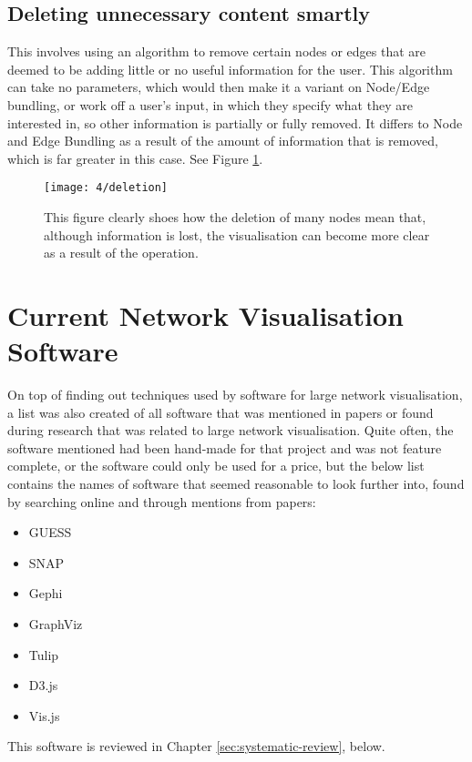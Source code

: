 \documentclass[../dissertation.tex]{subfiles}
\begin{document}
\subsection{Deleting unnecessary content smartly}
This involves using an algorithm to remove certain nodes or edges that are deemed to be adding little or no useful information for the user. This algorithm can take no parameters, which would then make it a variant on Node/Edge bundling, or work off a user's input, in which they specify what they are interested in, so other information is partially or fully removed. It differs to Node and Edge Bundling as a result of the amount of information that is removed, which is far greater in this case. See Figure \ref{fig:deletion}. 
\begin{figure}
    \centering
    \texttt{[image: 4/deletion]}
    \caption{This figure clearly shoes how the deletion of many nodes mean that, although information is lost, the visualisation can become more clear as a result of the operation. \cite{hu2015visualizing}}
    \label{fig:deletion}
\end{figure}

\section{Current Network Visualisation Software}

On top of finding out techniques used by software for large network visualisation, a list was also created of all software that was mentioned in papers or found during research that was related to large network visualisation. Quite often, the software mentioned had been hand-made for that project and was not feature complete, or the software could only be used for a price, but the below list contains the names of software that seemed reasonable to look further into, found by searching online and through mentions from papers:
\begin{itemize}
    \item GUESS \cite{guess}
    \item SNAP \cite{snap}
    \item Gephi \cite{gephi}
    \item GraphViz \cite{graphviz}
    \item Tulip \cite{tulip}
    \item D3.js \cite{d3}
    \item Vis.js \cite{vis}
\end{itemize}

This software is reviewed in Chapter \ref{sec:systematic-review}, below.
\end{document}
